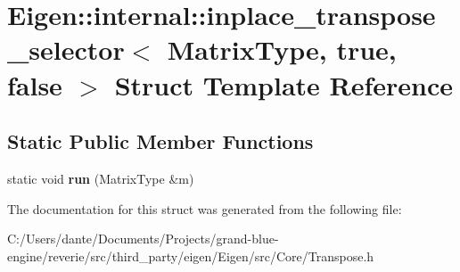 \hypertarget{struct_eigen_1_1internal_1_1inplace__transpose__selector_3_01_matrix_type_00_01true_00_01false_01_4}{}\section{Eigen\+::internal\+::inplace\+\_\+transpose\+\_\+selector$<$ Matrix\+Type, true, false $>$ Struct Template Reference}
\label{struct_eigen_1_1internal_1_1inplace__transpose__selector_3_01_matrix_type_00_01true_00_01false_01_4}
\subsection*{Static Public Member Functions}
\begin{DoxyCompactItemize}
\item 
\mbox{\label{struct_eigen_1_1internal_1_1inplace__transpose__selector_3_01_matrix_type_00_01true_00_01false_01_4_afa7c98bff0d27a49ff1edf9173307705}} 
static void {\bfseries run} (Matrix\+Type \&m)
\end{DoxyCompactItemize}


The documentation for this struct was generated from the following file\+:\begin{DoxyCompactItemize}
\item 
C\+:/\+Users/dante/\+Documents/\+Projects/grand-\/blue-\/engine/reverie/src/third\+\_\+party/eigen/\+Eigen/src/\+Core/Transpose.\+h\end{DoxyCompactItemize}
